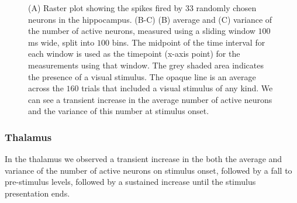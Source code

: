 \begin{figure}[p]
      \caption{(A) Raster plot showing the spikes fired by $33$ randomly chosen neurons in the hippocampus. (B-C) (B) average and (C) variance of the number of active neurons, measured using a sliding window $100$ms wide, split into $100$ bins. The midpoint of the time interval for each window is used as the timepoint (x-axis point) for the measurements using that window. The grey shaded area indicates the presence of a visual stimulus. The opaque line is an average across the $160$ trials that included a visual stimulus of any kind. We can see a transient increase in the average number of active neurons and the variance of this number at stimulus onset.}
      \label{fig:hippocampus_moving_avg_and_var}
    \end{figure}

    \subsubsection{Thalamus}
    In the thalamus we observed a transient increase in the both the average and variance of the number of active neurons on stimulus onset, followed by a fall to pre-stimulus levels, followed by a sustained increase until the stimulus presentation ends.

